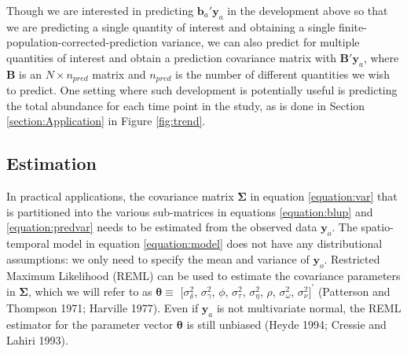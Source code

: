\documentclass[smallextended]{svjour3}       %
\begin{document}
Though we are interested in predicting \(\mathbf{b}_a ' \mathbf{y}_a\)
in the development above so that we are predicting a single quantity of
interest and obtaining a single finite-population-corrected-prediction
variance, we can also predict for multiple quantities of interest and
obtain a prediction covariance matrix with \(\mathbf{B}' \mathbf{y}_a\),
where \(\mathbf{B}\) is an \(N \times n_{pred}\) matrix and \(n_{pred}\)
is the number of different quantities we wish to predict. One setting
where such development is potentially useful is predicting the total
abundance for each time point in the study, as is done in Section
\ref{section:Application} in Figure \ref{fig:trend}.

\hypertarget{estimation}{%
\subsection{Estimation}\label{estimation}}

In practical applications, the covariance matrix \(\bm{\Sigma}\) in
equation \ref{equation:var} that is partitioned into the various
sub-matrices in equations \ref{equation:blup} and \ref{equation:predvar}
needs to be estimated from the observed data \(\mathbf{y}_o\). The
spatio-temporal model in equation \ref{equation:model} does not have any
distributional assumptions: we only need to specify the mean and
variance of \(\mathbf{y}_o\). Restricted Maximum Likelihood (REML) can
be used to estimate the covariance parameters in \(\bm{\Sigma}\), which
we will refer to as \(\bm{\theta} \equiv\) \([\sigma^2_{\delta}\),
\(\sigma^2_{\gamma}\), \(\phi\), \(\sigma^2_{\tau}\),
\(\sigma^2_{\eta}\), \(\rho\), \(\sigma^2_{\omega}\),
\(\sigma^2_{\nu}]^\prime\) (Patterson and Thompson 1971; Harville 1977).
Even if \(\mathbf{y}_a\) is not multivariate normal, the REML estimator
for the parameter vector \(\bm{\theta}\) is still unbiased (Heyde 1994;
Cressie and Lahiri 1993).
\end{document}
